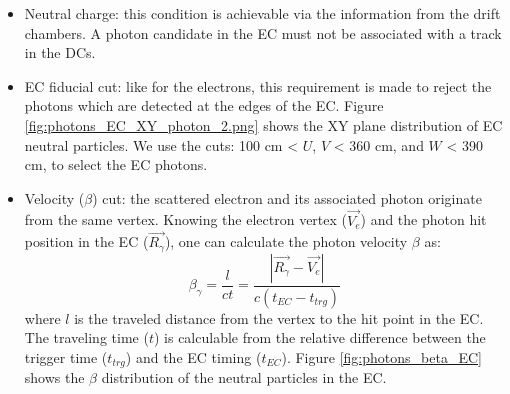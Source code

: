 \begin{itemize}
\item Neutral charge: this condition is achievable via the information from the drift chambers. A photon candidate in the EC must not be associated with a track in the DCs.

\item EC fiducial cut:  like for the electrons, this requirement is made to reject the photons which are detected at the edges of the EC. Figure \ref{fig:photons_EC_XY_photon_2.png} shows the XY plane distribution of EC neutral particles. We use the cuts: 100 cm < $U$, $V$ < 360 cm, and $W$ < 390 cm, to select the EC photons.

\item Velocity ($\beta$) cut: the scattered electron and its associated photon originate from the same vertex. Knowing the electron vertex ($\overrightarrow{V_{e}}$) and the photon hit position in the EC ($\overrightarrow{R_{\gamma}}$), one can calculate the photon velocity $\beta$ as:
\begin{equation}
\beta_{\gamma} = \frac{l}{ct} = \frac{|\overrightarrow{R_{\gamma}} - \overrightarrow{V_{e}}|}{c (t_{EC} - t_{trg})}
\end{equation}
where $l$ is the traveled distance from the vertex to the hit point in the EC. The traveling time ($t$) is calculable from the relative difference between the trigger time ($t_{trg}$) and the EC timing ($t_{EC}$). Figure \ref{fig:photons_beta_EC} shows the $\beta$ distribution of the neutral particles in the EC.
\end{itemize}
